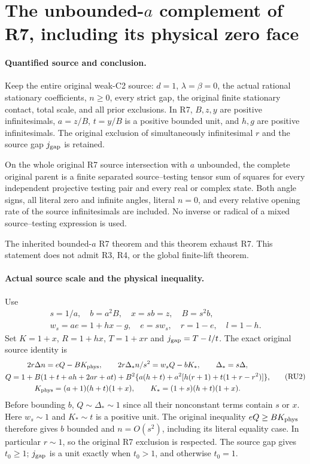 \section{The unbounded-$a$ complement of R7, including its physical zero face}
\label{sec:r7-unbounded-a}

\paragraph{Quantified source and conclusion.}
Keep the entire original weak-C2 source: $d=1$, $\lambda=\beta=0$,
the actual rational stationary coefficients, $n\ge0$, every strict gap,
the original finite stationary contact, total scale, and all prior
exclusions. In R7, $B,z,y$ are positive infinitesimals,
$a=z/B$, $t=y/B$ is a positive bounded unit, and $h,g$ are positive
infinitesimals. The original exclusion of simultaneously infinitesimal
$r$ and the source gap $j_{\rm gap}$ is retained.

\begin{theorem}
On the whole original R7 source intersection with $a$ unbounded,
the complete original parent is a finite separated source--testing
tensor sum of squares for every independent projective testing pair
and every real or complex state. Both angle signs, all literal zero
and infinite angles, literal $n=0$, and every relative opening rate
of the source infinitesimals are included. No inverse or radical of
a mixed source--testing expression is used.
\end{theorem}

The inherited bounded-$a$ R7 theorem and this theorem exhaust R7.
This statement does not admit R3, R4, or the global finite-lift theorem.

\paragraph{Actual source scale and the physical inequality.}
Use
\[
 \begin{gathered}
 s=1/a,\quad b=a^2B,\quad x=sb=z,\quad B=s^2b,\\
 w_s=ae=1+hx-g,\quad e=sw_s,\quad r=1-e,\quad l=1-h.
 \end{gathered}
 \tag{RU1}
\]
Set $K=1+x$, $R=1+hx$, $T=1+xr$ and
$j_{\rm gap}=T-l/t$. The exact original source identity is
\[
\begin{gathered}
 2r\Delta n=eQ-BK_{\rm phys},\qquad
 2r\Delta_*n/s^2=w_sQ-bK_*,\qquad \Delta_*=s\Delta,\\
 Q=1+B(1+t+ah+2ar+at)
    +B^2\{a(h+t)+a^2[h(r+1)+t(1+r-r^2)]\},\\
 K_{\rm phys}=(a+1)(h+t)(1+x),\qquad
 K_*=(1+s)(h+t)(1+x).
\end{gathered}                                                     \tag{RU2}
\]
Before bounding $b$, $Q\sim\Delta_*\sim1$ since all their nonconstant
terms contain $s$ or $x$. Here $w_s\sim1$ and $K_*\sim t$ is a
positive unit. The original inequality $eQ\ge BK_{\rm phys}$
therefore gives $b$ bounded and $n=O(s^2)$, including its literal
equality case. In particular $r\sim1$, so the original R7 exclusion
is respected. The source gap gives $t_0\ge1$; $j_{\rm gap}$ is a
unit exactly when $t_0>1$, and otherwise $t_0=1$.

